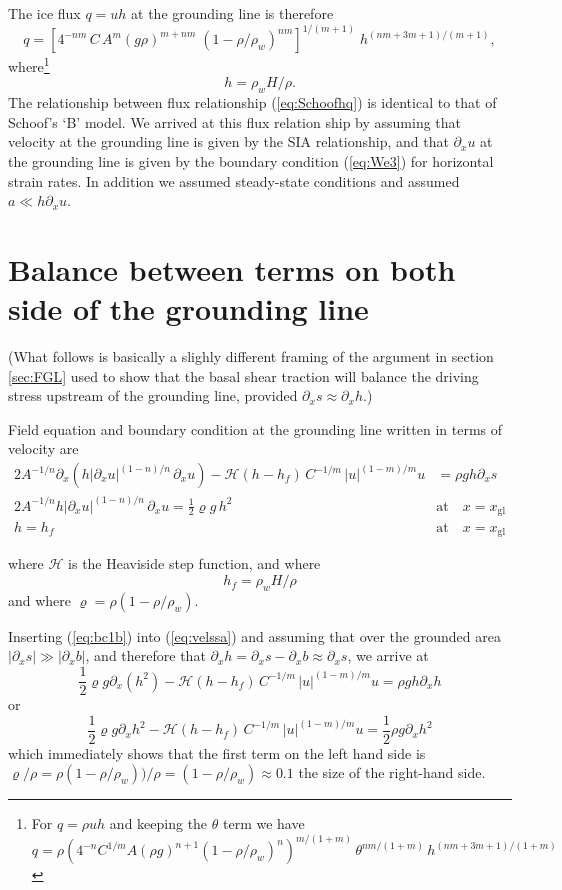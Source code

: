 \documentclass[10pt,a4paper]{book}
\newcommand{\He}{\mathcal{H}}
\newcommand{\p}{\partial}
\newcommand{\xgl}{x_{\mathrm{gl}}}
\begin{document}
The ice flux  $q=uh$ at the grounding line is therefore
\begin{equation}
q=  \left [ 4^{-n m} \, C \, A^m  (g \rho)^{m+n m} \; \left (1-\rho/\rho_w \right )^{n m}  \right ]^{1/(m+1)}  \; h^{(n m + 3 m + 1)/(m+1)} ,
\label{eq:Schoofhq}
\end{equation}
where\footnote{For $q=\rho u h$ and keeping the $\theta$ term we have
\[
q=\rho  \left ( 4^{-n} C^{1/m} A (\rho g)^{n+1} (1-\rho/\rho_w)^n  \right )^{m/(1+m)} \, \theta^{nm/(1+m)} \,  h^{(n m +3 m+1)/(1+m)} 
\]
}
\[
h=\rho_w H /\rho.
\]
The relationship between flux relationship (\ref{eq:Schoofhq}) is
identical to that of Schoof's `B' model.  We arrived at this flux
relation ship by assuming that velocity at the grounding line is given
by the SIA relationship, and that $\p_x u$ at the grounding line is
given by the boundary condition (\ref{eq:We3}) for horizontal strain
rates. In addition we assumed steady-state conditions and assumed $a
\ll h \p_x u$.




\section{Balance between terms on both side of the grounding line}

(What follows is basically a slighly different framing of the argument in
section \ref{sec:FGL} used to show that the basal shear traction will
balance the driving stress upstream of the grounding line, provided
$\p_x s \approx \p_x h$.)

Field equation and boundary condition at the
grounding line written in terms of velocity are
\begin{align}
2 A^{-1/n} \p_x \left (h |\p_x u|^{(1-n)/n} \, \p_x u \right ) - \He(h-h_f) \, C^{-1/m} \, |u|^{(1-m)/m} u & = \rho g h \p_x s  \label{eq:velssa}\\
2 A^{-1/n} h |\p_x u|^{(1-n)/n}   \, \p_x u  = \frac{1}{2} \varrho g \, h^2   \quad & \text{at} \quad x=\xgl\label{eq:bc1b} \\
h=h_f     \quad & \text{at} \quad x=\xgl\label{eq:bc2b}
\end{align}

where $\He$ is the Heaviside step function, and
where
\[
h_f=\rho_w H/\rho
\]
and where $\varrho=\rho (1-\rho/\rho_w)$. 

Inserting (\ref{eq:bc1b}) into (\ref{eq:velssa}) and assuming that over the grounded area 
$ |\p_x s| \gg |\p_x b|$, and therefore that $\p_x h = \p_x s - \p_x b \approx \p_x s $, we arrive at
\[
\frac{1}{2} \varrho g \p_x \left ( h^2  \right ) - \He(h-h_f) \, C^{-1/m} \, |u|^{(1-m)/m} u = \rho g h \p_x h  \label{eq:velssa2}
\]
or
\[
\frac{1}{2} \varrho g \p_x  h^2  - \He(h-h_f) \, C^{-1/m} \, |u|^{(1-m)/m} u = \frac{1}{2} \rho g  \p_x h^2  \label{eq:velssa3}
\]
which immediately shows that the first term on the left hand side is
$\varrho /\rho=\rho (1-\rho/\rho_w))/\rho=(1-\rho/\rho_w) \approx 0.1 $
the size of the right-hand side.
\end{document}

